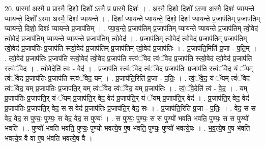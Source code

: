 \documentclass[17pt]{extarticle}
\begin{document}
20. प्रास्मा॑ अस्मै॒ प्र प्रास्मै॒ दिशो॒ दिशो᳚ ऽस्मै॒ प्र प्रास्मै॒ दिशः॑ । . अ॒स्मै॒ दिशो॒ दिशो᳚ ऽस्मा अस्मै॒ दिशः॑ प्यायन्ते प्यायन्ते॒ दिशो᳚ ऽस्मा अस्मै॒ दिशः॑ प्यायन्ते । . दिशः॑ प्यायन्ते प्यायन्ते॒ दिशो॒ दिशः॑ प्यायन्ते प्र॒जाप॑तिम् प्र॒जाप॑तिम् प्यायन्ते॒ दिशो॒ दिशः॑ प्यायन्ते प्र॒जाप॑तिम् । . प्या॒य॒न्ते॒ प्र॒जाप॑तिम् प्र॒जाप॑तिम् प्यायन्ते प्यायन्ते प्र॒जाप॑तिम् त्वो॒वेद॑ त्वो॒वेद॑ प्र॒जाप॑तिम् प्यायन्ते प्यायन्ते प्र॒जाप॑तिम् त्वो॒वेद॑ । . प्र॒जाप॑तिम् त्वो॒वेद॑ त्वो॒वेद॑ प्र॒जाप॑तिम् प्र॒जाप॑तिम् त्वो॒वेद॑ प्र॒जाप॑तिः प्र॒जाप॑ति स्त्वो॒वेद॑ प्र॒जाप॑तिम् प्र॒जाप॑तिम् त्वो॒वेद॑ प्र॒जाप॑तिः । . प्र॒जाप॑ति॒मिति॑ प्र॒जा - प॒ति॒म् । . त्वो॒वेद॑ प्र॒जाप॑तिः प्र॒जाप॑ति स्त्वो॒वेद॑ त्वो॒वेद॑ प्र॒जाप॑ति स्त्वंॅवेद त्वंॅवेद प्र॒जाप॑ति स्त्वो॒वेद॑ त्वो॒वेद॑ प्र॒जाप॑ति स्त्वंॅवेद । . त्वो॒वेदेति॑ त्वः - वेद॑ । . प्र॒जाप॑ति स्त्वंॅवेद त्वंॅवेद प्र॒जाप॑तिः प्र॒जाप॑ति स्त्वंॅवेद॒ यं ॅयम् त्वं॑ॅवेद प्र॒जाप॑तिः प्र॒जाप॑ति स्त्वंॅवेद॒ यम् । . प्र॒जाप॑ति॒रिति॑ प्र॒जा - प॒तिः॒ । . त्वं॒ॅवे॒द॒ यं ॅयम् त्वं॑ॅवेद त्वंॅवेद॒ यम् प्र॒जाप॑तिः प्र॒जाप॑ति॒र् यम् त्वं॑ॅवेद त्वंॅवेद॒ यम् प्र॒जाप॑तिः । . त्वं॒ॅवे॒देति॑ त्वं - वे॒द॒ । . यम् प्र॒जाप॑तिः प्र॒जाप॑ति॒र् यं ॅयम् प्र॒जाप॑ति॒र् वेद॒ वेद॑ प्र॒जाप॑ति॒र् यं ॅयम् प्र॒जाप॑ति॒र् वेद॑ । . प्र॒जाप॑ति॒र् वेद॒ वेद॑ प्र॒जाप॑तिः प्र॒जाप॑ति॒र् वेद॒ स स वेद॑ प्र॒जाप॑तिः प्र॒जाप॑ति॒र् वेद॒ सः । . प्र॒जाप॑ति॒रिति॑ प्र॒जा - प॒तिः॒ । . वेद॒ स स वेद॒ वेद॒ स पुण्यः॒ पुण्यः॒ स वेद॒ वेद॒ स पुण्यः॑ । . स पुण्यः॒ पुण्यः॒ स स पुण्यो॑ भवति भवति॒ पुण्यः॒ स स पुण्यो॑ भवति । . पुण्यो॑ भवति भवति॒ पुण्यः॒ पुण्यो॑ भवत्ये॒ष ए॒ष भ॑वति॒ पुण्यः॒ पुण्यो॑ भवत्ये॒षः । . भ॒व॒त्ये॒ष ए॒ष भ॑वति भवत्ये॒ष वै वा ए॒ष भ॑वति भवत्ये॒ष वै । \newline
\end{document}
